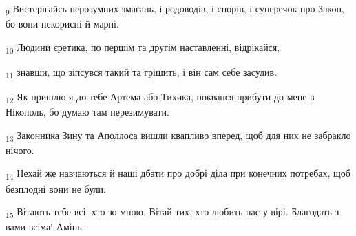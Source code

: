 \begin{tcolorbox}
\textsubscript{9} Вистерігайсь нерозумних змагань, і родоводів, і спорів, і суперечок про Закон, бо вони некорисні й марні.
\end{tcolorbox}
\begin{tcolorbox}
\textsubscript{10} Людини єретика, по першім та другім наставленні, відрікайся,
\end{tcolorbox}
\begin{tcolorbox}
\textsubscript{11} знавши, що зіпсувся такий та грішить, і він сам себе засудив.
\end{tcolorbox}
\begin{tcolorbox}
\textsubscript{12} Як пришлю я до тебе Артема або Тихика, поквапся прибути до мене в Нікополь, бо думаю там перезимувати.
\end{tcolorbox}
\begin{tcolorbox}
\textsubscript{13} Законника Зину та Аполлоса вишли квапливо вперед, щоб для них не забракло нічого.
\end{tcolorbox}
\begin{tcolorbox}
\textsubscript{14} Нехай же навчаються й наші дбати про добрі діла при конечних потребах, щоб безплодні вони не були.
\end{tcolorbox}
\begin{tcolorbox}
\textsubscript{15} Вітають тебе всі, хто зо мною. Вітай тих, хто любить нас у вірі. Благодать з вами всіма! Амінь.
\end{tcolorbox}
